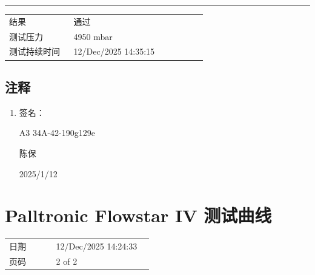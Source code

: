 \documentclass[UTF8,10pt,a4paper,fontset=fandol]{ctexart}
\newcommand{\fieldvalue}[1]{#1}
\newcommand{\handwritten}[1]{#1}
\begin{document}
\bigskip
\hrule
\bigskip

\begin{tabular}{@{}p{0.30\linewidth}p{0.62\linewidth}@{}}
结果 &
\fieldvalue{通过}
\\
测试压力 &
\fieldvalue{4950 mbar}
\\
测试持续时间 &
\fieldvalue{12/Dec/2025 14:35:15}
\end{tabular}

\subsection{注释}

\begin{enumerate}
\item 签名：

\fieldvalue{A3 34A-42-190g129e}

\handwritten{陈保}

\handwritten{2025/1/12}
\end{enumerate}

\section{Palltronic Flowstar IV 测试曲线}

\begin{tabular}{@{}p{0.30\linewidth}p{0.62\linewidth}@{}}
日期 &
\fieldvalue{12/Dec/2025 14:24:33}
\\
页码 &
\fieldvalue{2 of 2}
\end{tabular}

\bigskip

\begin{center}
\end{center}
\end{document}
